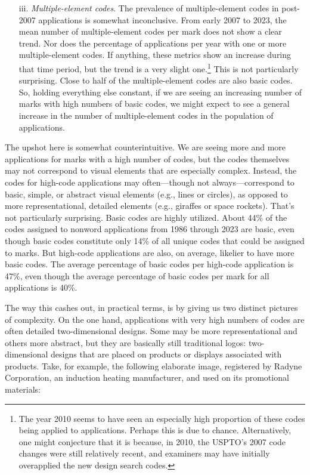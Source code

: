 \documentclass[letterpaper, 11pt, oneside]{article}
\begin{document}
\begin{enumerate}
\item[iii.] \textit{Multiple-element codes}. The prevalence of multiple-element codes in post-2007 applications is somewhat inconclusive. From early 2007 to 2023, the mean number of multiple-element codes per mark does not show a clear trend. Nor does the percentage of applications per year with one or more multiple-element codes. If anything, these metrics show an increase during that time period, but the trend is a very slight one.\footnote{The year 2010 seems to have seen an especially high proportion of these codes being applied to applications. Perhaps this is due to chance. Alternatively, one might conjecture that it is because, in 2010, the USPTO's 2007 code changes were still relatively recent, and examiners may have initially overapplied the new design search codes.} This is not particularly surprising. Close to half of the multiple-element codes are also basic codes. So, holding everything else constant, if we are seeing an increasing number of marks with high numbers of basic codes, we might expect to see a general increase in the number of multiple-element codes in the population of applications.

\end{enumerate}

The upshot here is somewhat counterintuitive. We are seeing more and more applications for marks with a high number of codes, but the codes themselves may not correspond to visual elements that are especially complex. Instead, the codes for high-code applications may often—though not always—correspond to basic, simple, or abstract visual elements (e.g., lines or circles), as opposed to more representational, detailed elements (e.g., giraffes or space rockets). That's not particularly surprising. Basic codes are highly utilized. About 44\% of the codes assigned to nonword applications from 1986 through 2023 are basic, even though basic codes constitute only 14\% of all unique codes that could be assigned to marks. But high-code applications are also, on average, likelier to have more basic codes. The average percentage of basic codes per high-code application is 47\%, even though the average percentage of basic codes per mark for all applications is 40\%.

The way this cashes out, in practical terms, is by giving us two distinct pictures of complexity. On the one hand, applications with very high numbers of codes are often detailed two-dimensional designs. Some may be more representational and others more abstract, but they are basically still traditional logos: two-dimensional designs that are placed on products or displays associated with products. Take, for example, the following elaborate image, registered by Radyne Corporation, an induction heating manufacturer, and used on its promotional materials:
\end{document}
